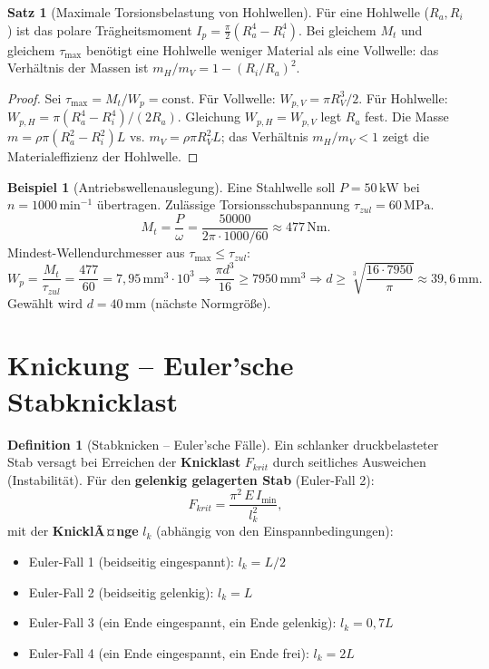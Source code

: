 ﻿\documentclass[a4paper,12pt]{report}
\theoremstyle{definition}
\newtheorem{definition}{Definition}
\newtheorem{beispiel}{Beispiel}
\newtheorem{satz}{Satz}
\begin{document}
\begin{satz}[Maximale Torsionsbelastung von Hohlwellen]
F\"ur eine Hohlwelle ($R_a, R_i$) ist das polare Tr\"agheitsmoment
$I_p = \tfrac{\pi}{2}(R_a^4 - R_i^4)$. Bei gleichem $M_t$ und gleichem $\tau_{\max}$
ben\"otigt eine Hohlwelle weniger Material als eine Vollwelle:
das Verh\"altnis der Massen ist $m_H/m_V = 1 - (R_i/R_a)^2$.
\end{satz}
\begin{proof}
Sei $\tau_{\max} = M_t/W_p = \mathrm{const}$. F\"ur Vollwelle: $W_{p,V} = \pi R_V^3/2$.
F\"ur Hohlwelle: $W_{p,H} = \pi(R_a^4 - R_i^4)/(2R_a)$.
Gleichung $W_{p,H} = W_{p,V}$ legt $R_a$ fest.
Die Masse $m = \rho\pi(R_a^2 - R_i^2)L$ vs. $m_V = \rho\pi R_V^2 L$;
das Verh\"altnis $m_H/m_V < 1$ zeigt die Materialeffizienz der Hohlwelle.
\end{proof}

\begin{beispiel}[Antriebswellenauslegung]
Eine Stahlwelle soll $P = 50\,\mathrm{kW}$ bei $n = 1000\,\mathrm{min^{-1}}$
\"ubertragen. Zul\"assige Torsionsschubspannung $\tau_{zul} = 60\,\mathrm{MPa}$.
\[
  M_t = \frac{P}{\omega} = \frac{50000}{2\pi\cdot1000/60} \approx 477\,\mathrm{Nm}.
\]
Mindest-Wellendurchmesser aus $\tau_{\max} \le \tau_{zul}$:
\[
  W_p = \frac{M_t}{\tau_{zul}} = \frac{477}{60} = 7{,}95\,\mathrm{mm^3}\cdot10^3
  \Rightarrow \frac{\pi d^3}{16} \ge 7950\,\mathrm{mm^3}
  \Rightarrow d \ge \sqrt[3]{\frac{16\cdot7950}{\pi}} \approx 39{,}6\,\mathrm{mm}.
\]
Gew\"ahlt wird $d = 40\,\mathrm{mm}$ (n\"achste Normgr\"o\ss{}e).
\end{beispiel}

\section{Knickung -- Euler'sche Stabknicklast}

\begin{definition}[Stabknicken -- Euler'sche F\"alle]
Ein schlanker druckbelasteter Stab versagt bei Erreichen der \textbf{Knicklast}
$F_{krit}$ durch seitliches Ausweichen (Instabilit\"at).
F\"ur den \textbf{gelenkig gelagerten Stab} (Euler-Fall 2):
\[
  F_{krit} = \frac{\pi^2\,E\,I_{\min}}{l_k^2},
\]
mit der \textbf{KnicklÃ¤nge} $l_k$ (abh\"angig von den Einspannbedingungen):
\begin{itemize}
    \item[-] Euler-Fall 1 (beidseitig eingespannt): $l_k = L/2$
    \item[-] Euler-Fall 2 (beidseitig gelenkig): $l_k = L$
    \item[-] Euler-Fall 3 (ein Ende eingespannt, ein Ende gelenkig): $l_k = 0{,}7L$
    \item[-] Euler-Fall 4 (ein Ende eingespannt, ein Ende frei): $l_k = 2L$
\end{itemize}
\end{definition}
\end{document}
